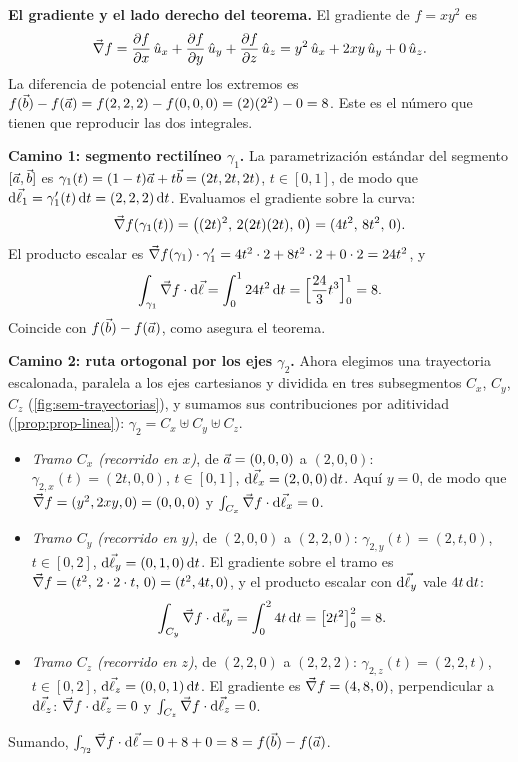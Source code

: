 \begin{resolucion}
\textbf{El gradiente y el lado derecho del teorema.} El gradiente de $f=xy^{2}$ es
\[
  \vec{\nabla} f=\frac{\partial f}{\partial x}\,\hat{u}_{x}+\frac{\partial f}{\partial y}\,\hat{u}_{y}+\frac{\partial f}{\partial z}\,\hat{u}_{z}=y^{2}\,\hat{u}_{x}+2xy\,\hat{u}_{y}+0\,\hat{u}_{z} .
\]
La diferencia de potencial entre los extremos es
$f(\vec{b})-f(\vec{a})=f(2,2,2)-f(0,0,0)=(2)(2^{2})-0=8$. Este es el número que
tienen que reproducir las dos integrales.

\textbf{Camino 1: segmento rectilíneo $\gamma_1$.} La parametrización estándar
del segmento $[\vec{a},\vec{b}]$ es
$\gamma_1(t)=(1-t)\vec{a}+t\vec{b}=(2t,2t,2t)$, $t\in[0,1]$, de modo que
$\mathrm{d}\vec{\ell}_1=\gamma_1'(t)\,\mathrm{d} t=(2,2,2)\,\mathrm{d} t$. Evaluamos el gradiente sobre la curva:
\[
  \vec{\nabla} f(\gamma_1(t))=\bigl((2t)^{2},\,2(2t)(2t),\,0\bigr)=(4t^{2},\,8t^{2},\,0).
\]
El producto escalar es $\vec{\nabla} f(\gamma_1)\cdot\gamma_1'=4t^{2}\cdot2+8t^{2}\cdot2+0\cdot2=24t^{2}$, y
\[
  \int_{\gamma_1}\vec{\nabla} f\cdot\mathrm{d}\vec{\ell}=\int_{0}^{1}24t^{2}\,\mathrm{d} t=\Bigl[\frac{24}{3}t^{3}\Bigr]_{0}^{1}=8 .
\]
Coincide con $f(\vec{b})-f(\vec{a})$, como asegura el teorema.

\textbf{Camino 2: ruta ortogonal por los ejes $\gamma_2$.} Ahora elegimos una
trayectoria escalonada, paralela a los ejes cartesianos y dividida en tres
subsegmentos $C_x$, $C_y$, $C_z$ (\cref{fig:sem-trayectorias}), y sumamos sus
contribuciones por aditividad (\cref{prop:prop-linea}):
$\gamma_2=C_x\uplus C_y\uplus C_z$.
\begin{itemize}
  \item \emph{Tramo $C_x$ (recorrido en $x$)}, de $\vec{a}=(0,0,0)$ a $(2,0,0)$:
        $\gamma_{2,x}(t)=(2t,0,0)$, $t\in[0,1]$, $\mathrm{d}\vec{\ell}_x=(2,0,0)\,\mathrm{d} t$. Aquí
        $y=0$, de modo que $\vec{\nabla} f=(y^{2},2xy,0)=(0,0,0)$ y
        $\int_{C_x}\vec{\nabla} f\cdot\mathrm{d}\vec{\ell}_x=0$.
  \item \emph{Tramo $C_y$ (recorrido en $y$)}, de $(2,0,0)$ a $(2,2,0)$:
        $\gamma_{2,y}(t)=(2,t,0)$, $t\in[0,2]$, $\mathrm{d}\vec{\ell}_y=(0,1,0)\,\mathrm{d} t$. El
        gradiente sobre el tramo es $\vec{\nabla} f=(t^{2},\,2\cdot2\cdot t,\,0)=(t^{2},4t,0)$,
        y el producto escalar con $\mathrm{d}\vec{\ell}_y$ vale $4t\,\mathrm{d} t$:
        \[
          \int_{C_y}\vec{\nabla} f\cdot\mathrm{d}\vec{\ell}_y=\int_{0}^{2}4t\,\mathrm{d} t=\bigl[2t^{2}\bigr]_{0}^{2}=8 .
        \]
  \item \emph{Tramo $C_z$ (recorrido en $z$)}, de $(2,2,0)$ a $(2,2,2)$:
        $\gamma_{2,z}(t)=(2,2,t)$, $t\in[0,2]$, $\mathrm{d}\vec{\ell}_z=(0,0,1)\,\mathrm{d} t$. El gradiente
        es $\vec{\nabla} f=(4,8,0)$, perpendicular a $\mathrm{d}\vec{\ell}_z$:
        $\vec{\nabla} f\cdot\mathrm{d}\vec{\ell}_z=0$ y $\int_{C_z}\vec{\nabla} f\cdot\mathrm{d}\vec{\ell}_z=0$.
\end{itemize}
Sumando, $\int_{\gamma_2}\vec{\nabla} f\cdot\mathrm{d}\vec{\ell}=0+8+0=8=f(\vec{b})-f(\vec{a})$.
\end{resolucion}

